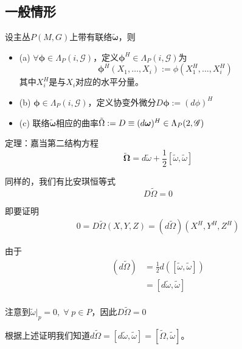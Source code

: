 \documentclass{ctexbook}
\begin{document}
\subsection{一般情形}

设主丛$P(M,G)$上带有联络$\tilde{\bm{\omega}}$，则

\begin{itemize}
    \item (a) $\forall\bm{\phi}\in\Lambda_P(i,\mathscr{G})$，定义$\bm{\phi}^H\in\Lambda_P(i,\mathscr{G})$为
    \begin{equation}
        \bm{\phi}^H(X_1,\dots,X_i):=\phi(X_1^H,\dots,X_i^H)
    \end{equation}
    其中$X_i^H$是与$X_i$对应的水平分量。
    \item (b) $\bm{\phi}\in\Lambda_P(i,\mathscr{G})$，定义协变外微分$D\bm{\phi}:=(d\phi)^H$
    \item (c) 联络$\tilde{\bm{\omega}}$相应的曲率$\tilde{\Omega}:=D\title{\omega}\equiv (d\bm{\omega})^H\in \Lambda_P(2,\mathscr{G})$
\end{itemize}

定理：嘉当第二结构方程
\begin{equation}
    \tilde{\bm{\Omega}}=d\tilde{\omega}+\frac{1}{2}[\tilde{\omega},\tilde{\omega}]
\end{equation}

同样的，我们有比安琪恒等式
\begin{equation}
    D\tilde{\Omega}=0
\end{equation}

即要证明
\begin{equation}
    \begin{split}
        0=D\tilde{\Omega}(X,Y,Z)=(d\tilde{\Omega})(X^H,Y^H,Z^H)
    \end{split}
\end{equation}

由于
\begin{equation}
\begin{split}
    (d\tilde{\Omega})
    &=\frac{1}{2}d([\tilde{\omega},\tilde{\omega}])\\
    &=[d\tilde{\omega},\tilde{\omega}]\\
\end{split}
\end{equation}

注意到$\tilde{\omega}|_{p}=0,\;\forall\;p\in P$，因此$D\tilde{\Omega}=0$

根据上述证明我们知道$d\tilde{\Omega}=[d \tilde{\omega},\tilde{\omega}]=[\tilde{\Omega},\tilde{\omega}]$。
\end{document}
